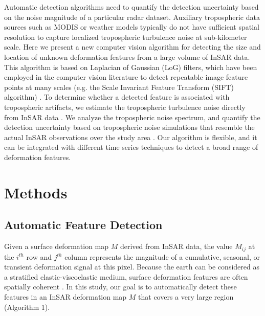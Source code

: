 Automatic detection algorithms need to quantify the detection uncertainty based on the noise magnitude of a particular radar dataset. Auxiliary tropospheric data sources such as MODIS or weather models typically do not have sufficient spatial resolution to capture localized tropospheric turbulence noise at sub-kilometer scale. Here we present a new computer vision algorithm for detecting the size and location of unknown deformation features from a large volume of InSAR data. This algorithm is based on Laplacian of Gaussian (LoG) filters, which have been employed in the computer vision literature to detect repeatable image feature points at many scales (e.g. the Scale Invariant Feature Transform (SIFT) algorithm) \cite{Witkin1987ScaleSpaceFiltering, Lindeberg1998FeatureDetectionAutomatic, Lowe2004DistinctiveImageFeatures}. To determine whether a detected feature is associated with tropospheric artifacts, we estimate the tropospheric turbulence noise directly from InSAR data \cite{Tymofyeyeva2015MitigationAtmosphericPhase}. We analyze the tropospheric noise spectrum, and quantify the detection uncertainty based on tropospheric noise simulations that resemble the actual InSAR observations over the study area \cite{Hanssen2001RadarInterferometryData}.
Our algorithm is flexible, and it can be integrated with different time series techniques to detect a broad range of deformation features.




\section{Methods}
\label{sec:methods}

\subsection{Automatic Feature Detection}
\label{subsec:methods-1-log}

Given a surface deformation map $M$ derived from InSAR data, the value $ M_{ij} $ at the $i^{th}$ row and $j^{th}$ column represents the magnitude of a cumulative, seasonal, or transient deformation signal at this pixel. Because the earth can be considered as a stratified elastic-viscoelastic medium, surface deformation features are often spatially coherent \cite{Segall2010EarthquakeVolcanoDeformation}. In this study, our goal is to automatically detect these features in an InSAR deformation map $M$ that covers a very large region (Algorithm 1).


